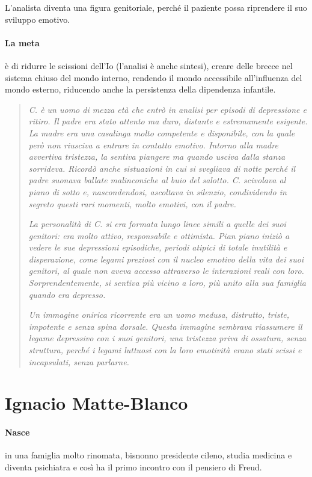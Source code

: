 \documentclass[12pt, a4paper]{article}
\begin{document}
L'analista diventa una figura genitoriale, perché il paziente possa riprendere il suo sviluppo emotivo.

\paragraph{La meta}  è di ridurre le scissioni dell'Io (l'analisi è anche sintesi), creare delle brecce nel sistema chiuso del mondo interno, rendendo il mondo accessibile all'influenza del mondo esterno, riducendo anche la persistenza della dipendenza infantile.

\begin{quote}
    \emph{C. è un uomo di mezza età che entrò in analisi per episodi di depressione e ritiro. Il padre era stato attento ma duro, distante e estremamente esigente. La madre era una casalinga molto competente e disponibile, con la quale però non riusciva a entrare in contatto emotivo. Intorno alla madre avvertiva tristezza, la sentiva piangere ma quando usciva dalla stanza sorrideva. Ricordò anche sistuazioni in cui si svegliava di notte perché il padre suonava ballate malinconiche
    al buio del salotto. C. scivolava al piano di sotto e, nascondendosi, ascoltava in silenzio, condividendo in segreto questi rari momenti, molto emotivi, con il padre.}
    
    \emph{La personalità di C. si era formata lungo linee simili a quelle dei suoi genitori: era molto attivo, responsabile e ottimista. Pian piano iniziò a vedere le sue depressioni episodiche, periodi atipici di totale inutilità e disperazione, come legami preziosi con il nucleo emotivo della vita dei suoi genitori, al quale non aveva accesso attraverso le interazioni reali con loro. Sorprendentemente, si sentiva più vicino a loro, più unito alla sua famiglia quando era depresso.}

    \emph{Un immagine onirica ricorrente era un uomo medusa, distrutto, triste, impotente e senza spina dorsale. Questa immagine sembrava riassumere il legame depressivo con i suoi genitori, una tristezza priva di ossatura, senza struttura, perché i legami luttuosi con la loro emotività erano stati scissi e incapsulati, senza parlarne.}
\end{quote}

\section{Ignacio Matte-Blanco}

\paragraph{Nasce} in una famiglia molto rinomata, bisnonno preside\-nte cileno, studia medicina e diventa psichiatra e cos\`i ha il primo incontro con il pensiero di Freud. 
\end{document}
